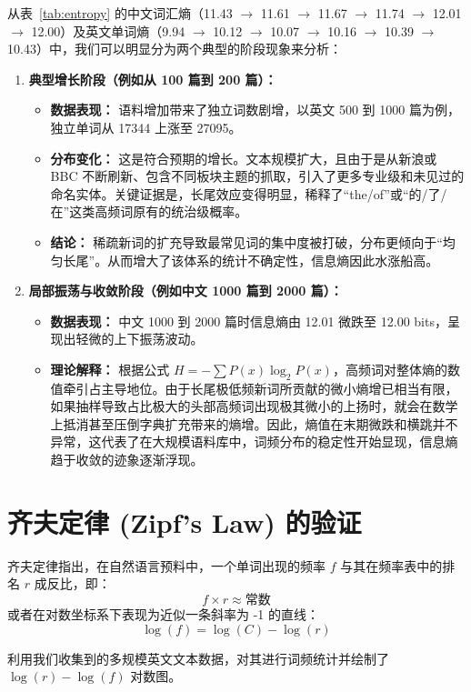 \documentclass[11pt]{article}
\begin{document}
从表~\ref{tab:entropy} 的中文词汇熵（11.43 $\to$ 11.61 $\to$ 11.67 $\to$ 11.74 $\to$ 12.01 $\to$ 12.00）及英文单词熵（9.94 $\to$ 10.12 $\to$ 10.07 $\to$ 10.16 $\to$ 10.39 $\to$ 10.43）中，我们可以明显分为两个典型的阶段现象来分析：
\begin{enumerate}
    \item \textbf{典型增长阶段（例如从 100 篇到 200 篇）：}
    \begin{itemize}
        \item \textbf{数据表现：} 语料增加带来了独立词数剧增，以英文 500 到 1000 篇为例，独立单词从 17344 上涨至 27095。
        \item \textbf{分布变化：} 这是符合预期的增长。文本规模扩大，且由于是从新浪或 BBC 不断刷新、包含不同板块主题的抓取，引入了更多专业级和未见过的命名实体。关键证据是，长尾效应变得明显，稀释了“the/of”或“的/了/在”这类高频词原有的统治级概率。
        \item \textbf{结论：} 稀疏新词的扩充导致最常见词的集中度被打破，分布更倾向于“均匀长尾”。从而增大了该体系的统计不确定性，信息熵因此水涨船高。
    \end{itemize}
    \item \textbf{局部振荡与收敛阶段（例如中文 1000 篇到 2000 篇）：}
    \begin{itemize}
        \item \textbf{数据表现：} 中文 1000 到 2000 篇时信息熵由 12.01 微跌至 12.00 bits，呈现出轻微的上下振荡波动。
        \item \textbf{理论解释：} 根据公式 $H = -\sum P(x) \log_2 P(x)$，高频词对整体熵的数值牵引占主导地位。由于长尾极低频新词所贡献的微小熵增已相当有限，如果抽样导致占比极大的头部高频词出现极其微小的上扬时，就会在数学上抵消甚至压倒字典扩充带来的熵增。因此，熵值在末期微跌和横跳并不异常，这代表了在大规模语料库中，词频分布的稳定性开始显现，信息熵趋于收敛的迹象逐渐浮现。
    \end{itemize}
\end{enumerate}

\section{齐夫定律 (Zipf's Law) 的验证}
齐夫定律指出，在自然语言预料中，一个单词出现的频率 $f$ 与其在频率表中的排名 $r$ 成反比，即：
$$ f \times r \approx \text{常数} $$
或者在对数坐标系下表现为近似一条斜率为 -1 的直线：
$$ \log(f) = \log(C) - \log(r) $$

利用我们收集到的多规模英文文本数据，对其进行词频统计并绘制了 $\log(r) - \log(f)$ 对数图。
\end{document}
